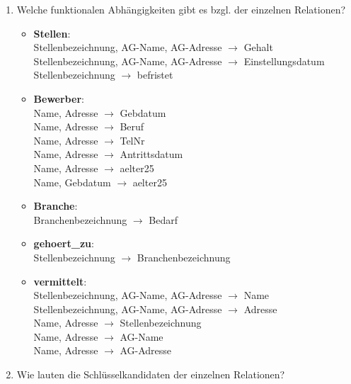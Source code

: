 \documentclass{lehramt-informatik}
\begin{document}
\begin{enumerate}


\item Welche funktionalen Abhängigkeiten gibt es bzgl. der einzelnen
Relationen?

\begin{antwort}[muster]
\begin{itemize}
\item \textbf{Stellen}: \\
Stellenbezeichnung, AG-Name, AG-Adresse $\rightarrow$ Gehalt \\
Stellenbezeichnung, AG-Name, AG-Adresse $\rightarrow$ Einstellungsdatum \\
Stellenbezeichnung $\rightarrow$ befristet

\item \textbf{Bewerber}: \\
Name, Adresse $\rightarrow$ Gebdatum \\
Name, Adresse $\rightarrow$ Beruf \\
Name, Adresse $\rightarrow$ TelNr \\
Name, Adresse $\rightarrow$ Antrittsdatum \\
Name, Adresse $\rightarrow$ aelter25 \\
Name, Gebdatum $\rightarrow$ aelter25

\item \textbf{Branche}: \\
Branchenbezeichnung $\rightarrow$ Bedarf

\item \textbf{gehoert\_zu}: \\
Stellenbezeichnung $\rightarrow$ Branchenbezeichnung

\item \textbf{vermittelt}: \\
Stellenbezeichnung, AG-Name, AG-Adresse $\rightarrow$ Name \\
Stellenbezeichnung, AG-Name, AG-Adresse $\rightarrow$ Adresse \\
Name, Adresse $\rightarrow$ Stellenbezeichnung \\
Name, Adresse $\rightarrow$ AG-Name \\
Name, Adresse $\rightarrow$ AG-Adresse
\end{itemize}

\end{antwort}


\item Wie lauten die Schlüsselkandidaten der einzelnen Relationen?


\end{enumerate}
\end{document}
